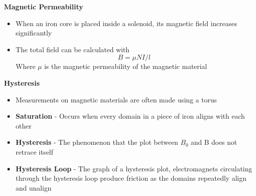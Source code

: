 \textbf{Magnetic Permeability}
\begin{itemize}
    \item When an iron core is placed inside a solenoid, its magnetic field increases significantly
    \item The total field can be calculated with \[B=\mu NI/l\] Where \(\mu\) is the magnetic permeability of the magnetic material
\end{itemize}

\textbf{Hysteresis}
\begin{itemize}
    \item Measurements on magnetic materials are often made using a torus
    \item \textbf{Saturation} - Occurs when every domain in a piece of iron aligns with each other
    \item \textbf{Hysteresis} - The phenomenon that the plot between \(B_0\) and B does not retrace itself
    \item \textbf{Hysteresis Loop} - The graph of a hysteresis plot, electromagnets circulating through the hysteresis loop produce friction as the domains repeatedly align and unalign
\end{itemize}

\newpage